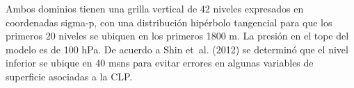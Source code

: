 \documentclass[12pt,spanish,oneside, a4paper]{book}
\begin{document}
Ambos dominios tienen una grilla vertical de 42 niveles expresados en
coordenadas sigma-p, con una distribución hipérbolo tangencial para que
los primeros 20 niveles se ubiquen en los primeros 1800 m. La presión en
el tope del modelo es de 100 hPa. De acuerdo a Shin et~al. (2012) se
determinó que el nivel inferior se ubique en 40 msns para evitar errores
en algunas variables de superficie asociadas a la CLP.

\begin{figure}

{\centering {}\hfill{}

}
\end{figure}
\end{document}

